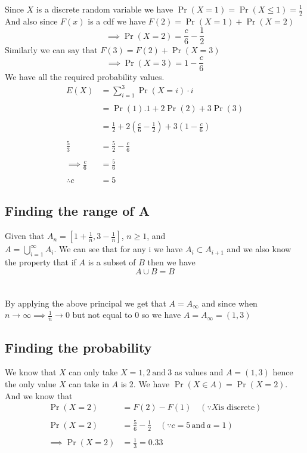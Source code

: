 \documentclass[journal,12pt,twocolumn]{IEEEtran}
\providecommand{\brak}[1]{\ensuremath{\left(#1\right)}}
\begin{document}
Since $X$ is a discrete random variable we have $\Pr\brak{X=1} = \Pr\brak{X\leq1} = \frac{1}{2}$\\And also since $F\brak{x}$ is a cdf we have $F\brak{2} = \Pr\brak{X=1}+\Pr\brak{X=2}$\\
$$\implies \Pr\brak{X=2} = \frac{c}{6}-\frac{1}{2}$$
Similarly we can say that $F\brak{3} = F\brak{2} + \Pr\brak{X=3}$
$$\implies \Pr\brak{X=3} = 1 - \frac{c}{6}$$
We have all the required probability values.
\begin{align}
 E\brak{X} &= \sum_{i=1}^{3}\Pr\brak{X=i}\cdot i\\
\nonumber \\
 &= \Pr\brak{1}.1 +2\Pr\brak{2} + 3\Pr\brak{3}\\
\nonumber \\
 &= \frac{1}{2}+ 2\brak{\frac{c}{6}-\frac{1}{2}}+3\brak{1-\frac{c}{6}}\\
\nonumber \\
\frac{5}{3} &= \frac{5}{2} - \frac{c}{6}\\
\nonumber \\
 \implies\frac{c}{6} &= \frac{5}{6}\\
\nonumber \\
 \therefore c &= 5
\end{align}



\subsection{Finding the range of A}
Given that $A_n = \left[1+\frac{1}{n},3-\frac{1}{n}\right]$, $n\geq1$, and \\$A = \bigcup_{i=1}^{\infty}A_i$. We can see  that for any i we have $A_i \subset A_{i+1}$ and we also know the property that if $A$ is a subset of $B$ then we have $$A\cup B = B$$\\\\
By applying the above principal we get that $A = A_\infty$ and since when $n \rightarrow \infty \implies \frac{1}{n} \rightarrow 0$ but not equal to 0 so we have $A = A_\infty = \brak{1,3}$

\subsection{Finding the probability }
 We know that $X$ can only take $X =1,2 \: \text{and}\: 3 $ as values and $A = \brak{1,3} $ hence the only value $X$ can take in $A$ is 2. We have $\Pr\brak{X\in A} = \Pr\brak{X = 2}$. And we know that  
\begin{align}
 \Pr\brak{X =2 } &= F\brak{2}-F\brak{1} \quad \brak{\because X \text{is discrete}}\\
\nonumber \\
\Pr\brak{X =2 } &= \frac{5}{6}-\frac{1}{2} \quad \brak{\because c =5 \,\text{and} \,a = 1}\\
\nonumber\\
 \implies \Pr\brak{X = 2} &= \frac{1}{3}=0.33
\end{align}
\end{document}
